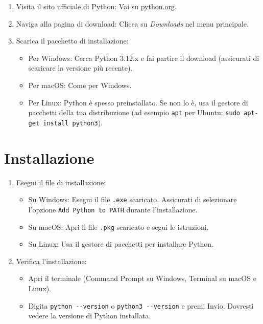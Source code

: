 \documentclass[
  letterpaper,
]{scrbook}
\providecommand{\tightlist}{%
  \setlength{\itemsep}{0pt}\setlength{\parskip}{0pt}}\usepackage{longtable,booktabs,array}
\begin{document}
\begin{enumerate}
\def\labelenumi{\arabic{enumi}.}
\tightlist
\item
  Visita il sito ufficiale di Python: Vai su
  \href{https://www.python.org/}{python.org}.
\item
  Naviga alla pagina di download: Clicca su \emph{Downloads} nel menu
  principale.
\item
  Scarica il pacchetto di installazione:

  \begin{itemize}
  \tightlist
  \item
    Per Windows: Cerca Python 3.12.x e fai partire il download
    (assicurati di scaricare la versione più recente).
  \item
    Per macOS: Come per Windows.
  \item
    Per Linux: Python è spesso preinstallato. Se non lo è, usa il
    gestore di pacchetti della tua distribuzione (ad esempio
    \texttt{apt} per Ubuntu: \texttt{sudo\ apt-get\ install\ python3}).
  \end{itemize}
\end{enumerate}

\section{Installazione}\label{installazione}

\begin{enumerate}
\def\labelenumi{\arabic{enumi}.}
\tightlist
\item
  Esegui il file di installazione:

  \begin{itemize}
  \tightlist
  \item
    Su Windows: Esegui il file \texttt{.exe} scaricato. Assicurati di
    selezionare l'opzione \texttt{Add\ Python\ to\ PATH} durante
    l'installazione.
  \item
    Su macOS: Apri il file \texttt{.pkg} scaricato e segui le
    istruzioni.
  \item
    Su Linux: Usa il gestore di pacchetti per installare Python.
  \end{itemize}
\item
  Verifica l'installazione:

  \begin{itemize}
  \tightlist
  \item
    Apri il terminale (Command Prompt su Windows, Terminal su macOS e
    Linux).
  \item
    Digita \texttt{python\ -\/-version} o \texttt{python3\ -\/-version}
    e premi Invio. Dovresti vedere la versione di Python installata.
  \end{itemize}
\end{enumerate}
\end{document}
